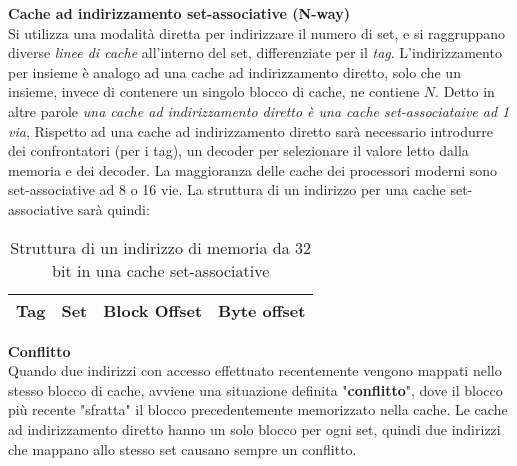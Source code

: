 \begin{defn}
    \textbf{Cache ad indirizzamento set-associative (N-way)} \\
    Si utilizza una modalità diretta per indirizzare il numero di set, e si
    raggruppano diverse \textit{linee di cache} all'interno del set,
    differenziate per il \textit{tag}. L'indirizzamento per insieme è analogo ad
    una cache ad indirizzamento diretto, solo che un insieme, invece di
    contenere un singolo blocco di cache, ne contiene $N$. Detto in altre parole
    \textit{una cache ad indirizzamento diretto è una cache set-associataive ad
    1 via},  Rispetto ad una cache ad indirizzamento diretto sarà necessario
    introdurre dei confrontatori (per i tag), un decoder per selezionare il
    valore letto dalla memoria e dei decoder. La maggioranza delle cache dei
    processori moderni sono set-associative ad 8 o 16 vie. La struttura di un
    indirizzo per una cache set-associative sarà quindi:
    \begin{table}[htbp]
        \centering
        \caption{Struttura di un indirizzo di memoria da 32 bit in una cache set-associative}
        \label{tab:addr-setassoc}
        \begin{tabular}{|l|l|l|l|}
        \hline
        Tag & Set & Block Offset & Byte offset \\ \hline
        \end{tabular}
    \end{table}
\end{defn}

\begin{defn}
    \textbf{Conflitto} \\
    Quando due indirizzi con accesso effettuato recentemente vengono mappati
    nello stesso blocco di cache, avviene una situazione definita
    "\textbf{conflitto}", dove il blocco più recente "sfratta" il blocco
    precedentemente memorizzato nella cache. Le cache ad indirizzamento diretto
    hanno un solo blocco per ogni set, quindi due indirizzi che mappano allo
    stesso set causano sempre un conflitto.
\end{defn}


